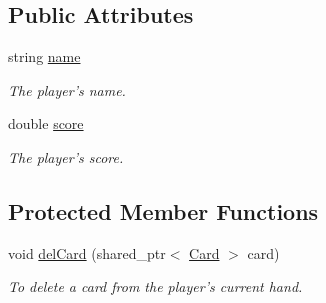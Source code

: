 \subsection*{\-Public \-Attributes}
\begin{DoxyCompactItemize}
\item 
\hypertarget{classPlayer_acf0355128a99ee20ad9931b760fb2de1}{string \hyperlink{classPlayer_acf0355128a99ee20ad9931b760fb2de1}{name}}\label{classPlayer_acf0355128a99ee20ad9931b760fb2de1}

\begin{DoxyCompactList}\small\item\em \-The player's name. \end{DoxyCompactList}\item 
\hypertarget{classPlayer_a55f7b5b674245c2e09f3c191a54d3542}{double \hyperlink{classPlayer_a55f7b5b674245c2e09f3c191a54d3542}{score}}\label{classPlayer_a55f7b5b674245c2e09f3c191a54d3542}

\begin{DoxyCompactList}\small\item\em \-The player's score. \end{DoxyCompactList}\end{DoxyCompactItemize}
\subsection*{\-Protected \-Member \-Functions}
\begin{DoxyCompactItemize}
\item 
void \hyperlink{classPlayer_a82c40ddca5214bbc9cc204ae9b789ca7}{del\-Card} (shared\-\_\-ptr$<$ \hyperlink{classCard}{\-Card} $>$ card)
\begin{DoxyCompactList}\small\item\em \-To delete a card from the player's current hand. \end{DoxyCompactList}\end{DoxyCompactItemize}

